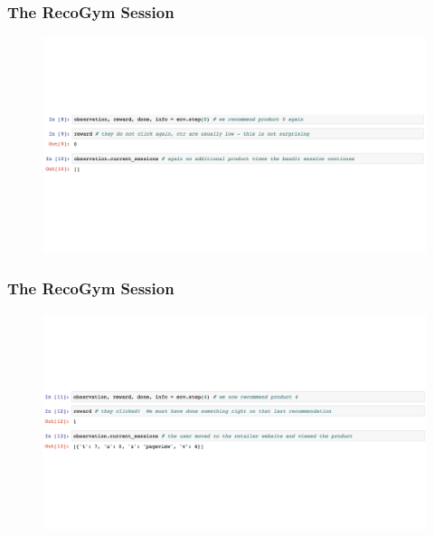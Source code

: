  \begin{frame}
  \frametitle{The RecoGym Session}
 
 
   \begin{figure}[h!]
     \includegraphics[scale=0.3]{images/reco_gym_sess2.png}
       \centering
       \label{motex1}
   \end{figure}
     
 \end{frame}



 \begin{frame}
  \frametitle{The RecoGym Session}
 
 
   \begin{figure}[h!]
     \includegraphics[scale=0.3]{images/reco_gym_sess3.png}
       \centering
       \label{motex1}
   \end{figure}
\end{frame}



